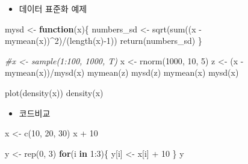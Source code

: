 \documentclass[
]{book}
\newenvironment{Shaded}{\begin{snugshade}}{\end{snugshade}}
\newcommand{\CommentTok}[1]{\textcolor[rgb]{0.56,0.35,0.01}{\textit{#1}}}
\newcommand{\ControlFlowTok}[1]{\textcolor[rgb]{0.13,0.29,0.53}{\textbf{#1}}}
\newcommand{\DecValTok}[1]{\textcolor[rgb]{0.00,0.00,0.81}{#1}}
\newcommand{\FunctionTok}[1]{\textcolor[rgb]{0.00,0.00,0.00}{#1}}
\newcommand{\NormalTok}[1]{#1}
\newcommand{\OtherTok}[1]{\textcolor[rgb]{0.56,0.35,0.01}{#1}}
\newcommand{\SpecialCharTok}[1]{\textcolor[rgb]{0.00,0.00,0.00}{#1}}
\providecommand{\tightlist}{%
  \setlength{\itemsep}{0pt}\setlength{\parskip}{0pt}}
\begin{document}
\begin{itemize}
\tightlist
\item
  데이터 표준화 예제
\end{itemize}

\begin{Shaded}
\begin{Highlighting}[]
\NormalTok{mysd }\OtherTok{\textless{}{-}} \ControlFlowTok{function}\NormalTok{(x)\{}
\NormalTok{  numbers\_sd }\OtherTok{\textless{}{-}} \FunctionTok{sqrt}\NormalTok{(}\FunctionTok{sum}\NormalTok{((x }\SpecialCharTok{{-}} \FunctionTok{mymean}\NormalTok{(x))}\SpecialCharTok{\^{}}\DecValTok{2}\NormalTok{)}\SpecialCharTok{/}\NormalTok{(}\FunctionTok{length}\NormalTok{(x)}\SpecialCharTok{{-}}\DecValTok{1}\NormalTok{))  }
  \FunctionTok{return}\NormalTok{(numbers\_sd)}
\NormalTok{\}}

\CommentTok{\#x \textless{}{-} sample(1:100, 1000, T)}
\NormalTok{x }\OtherTok{\textless{}{-}} \FunctionTok{rnorm}\NormalTok{(}\DecValTok{1000}\NormalTok{, }\DecValTok{10}\NormalTok{, }\DecValTok{5}\NormalTok{)}
\NormalTok{z }\OtherTok{\textless{}{-}}\NormalTok{ (x }\SpecialCharTok{{-}} \FunctionTok{mymean}\NormalTok{(x))}\SpecialCharTok{/}\FunctionTok{mysd}\NormalTok{(x)}
\FunctionTok{mymean}\NormalTok{(z)}
\FunctionTok{mysd}\NormalTok{(z)}
\FunctionTok{mymean}\NormalTok{(x)}
\FunctionTok{mysd}\NormalTok{(x)}

\FunctionTok{plot}\NormalTok{(}\FunctionTok{density}\NormalTok{(x))}
\FunctionTok{density}\NormalTok{(x)}
\end{Highlighting}
\end{Shaded}

\begin{itemize}
\tightlist
\item
  코드비교
\end{itemize}

\begin{Shaded}
\begin{Highlighting}[]
\NormalTok{x }\OtherTok{\textless{}{-}} \FunctionTok{c}\NormalTok{(}\DecValTok{10}\NormalTok{, }\DecValTok{20}\NormalTok{, }\DecValTok{30}\NormalTok{)}
\NormalTok{x }\SpecialCharTok{+} \DecValTok{10}

\NormalTok{y }\OtherTok{\textless{}{-}} \FunctionTok{rep}\NormalTok{(}\DecValTok{0}\NormalTok{, }\DecValTok{3}\NormalTok{)}
\ControlFlowTok{for}\NormalTok{(i }\ControlFlowTok{in} \DecValTok{1}\SpecialCharTok{:}\DecValTok{3}\NormalTok{)\{}
\NormalTok{  y[i] }\OtherTok{\textless{}{-}}\NormalTok{ x[i] }\SpecialCharTok{+} \DecValTok{10}
\NormalTok{\}}
\NormalTok{y}
\end{Highlighting}
\end{Shaded}
\end{document}
